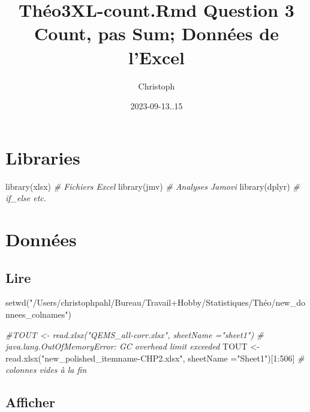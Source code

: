 \documentclass[
]{article}
\title{Théo3XL-count.Rmd Question 3 Count, pas Sum; Données de l'Excel}
\author{Christoph}
\date{2023-09-13..15}
\newenvironment{Shaded}{\begin{snugshade}}{\end{snugshade}}
\newcommand{\AttributeTok}[1]{\textcolor[rgb]{0.77,0.63,0.00}{#1}}
\newcommand{\CommentTok}[1]{\textcolor[rgb]{0.56,0.35,0.01}{\textit{#1}}}
\newcommand{\DecValTok}[1]{\textcolor[rgb]{0.00,0.00,0.81}{#1}}
\newcommand{\FunctionTok}[1]{\textcolor[rgb]{0.00,0.00,0.00}{#1}}
\newcommand{\NormalTok}[1]{#1}
\newcommand{\OtherTok}[1]{\textcolor[rgb]{0.56,0.35,0.01}{#1}}
\newcommand{\SpecialCharTok}[1]{\textcolor[rgb]{0.00,0.00,0.00}{#1}}
\newcommand{\StringTok}[1]{\textcolor[rgb]{0.31,0.60,0.02}{#1}}
\begin{document}
\maketitle

\hypertarget{libraries}{%
\section{Libraries}\label{libraries}}

\begin{Shaded}
\begin{Highlighting}[]
\FunctionTok{library}\NormalTok{(xlsx)                                         }\CommentTok{\# Fichiers Excel}
\FunctionTok{library}\NormalTok{(jmv)                                          }\CommentTok{\# Analyses Jamovi}
\FunctionTok{library}\NormalTok{(dplyr)                                        }\CommentTok{\# if\_else etc.}
\end{Highlighting}
\end{Shaded}

\hypertarget{donnuxe9es}{%
\section{Données}\label{donnuxe9es}}

\hypertarget{lire}{%
\subsection{Lire}\label{lire}}

\begin{Shaded}
\begin{Highlighting}[]
\FunctionTok{setwd}\NormalTok{(}\StringTok{"/Users/christophpahl/Bureau/Travail+Hobby/Statistiques/Théo/new\_donnees\_colnames"}\NormalTok{)}

\CommentTok{\#TOUT \textless{}{-} read.xlsx("QEMS\_all{-}corr.xlsx", sheetName ="sheet1")  \# java.lang.OutOfMemoryError: GC overhead limit exceeded}
\NormalTok{TOUT }\OtherTok{\textless{}{-}} \FunctionTok{read.xlsx}\NormalTok{(}\StringTok{"new\_polished\_itemname{-}CHP2.xlsx"}\NormalTok{, }\AttributeTok{sheetName =}\StringTok{"Sheet1"}\NormalTok{)[}\DecValTok{1}\SpecialCharTok{:}\DecValTok{506}\NormalTok{]  }\CommentTok{\# colonnes vides à la fin }
\end{Highlighting}
\end{Shaded}

\hypertarget{afficher}{%
\subsection{Afficher}\label{afficher}}
\end{document}
